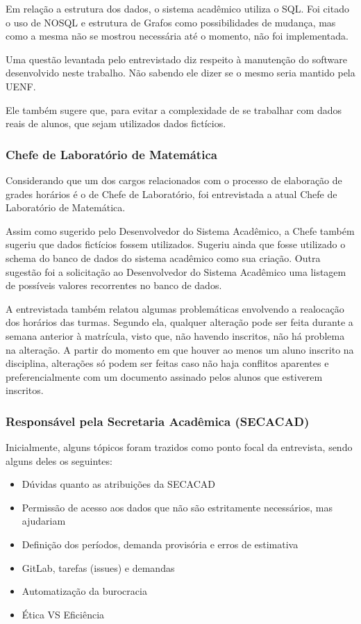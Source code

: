 Em relação a estrutura dos dados, o sistema acadêmico utiliza o SQL. Foi citado o uso de NOSQL e estrutura de Grafos como possibilidades de mudança, mas como a mesma não se mostrou necessária até o momento, não foi implementada.

Uma questão levantada pelo entrevistado diz respeito à manutenção do software desenvolvido neste trabalho. Não sabendo ele dizer se o mesmo seria mantido pela UENF.

Ele também sugere que, para evitar a complexidade de se trabalhar com dados reais de alunos, que sejam utilizados dados fictícios.

\subsubsection{Chefe de Laboratório de Matemática} %

Considerando que um dos cargos relacionados com o processo de elaboração de grades horários é o de Chefe de Laboratório, foi entrevistada a atual Chefe de Laboratório de Matemática.

Assim como sugerido pelo Desenvolvedor do Sistema Acadêmico, a Chefe também sugeriu que dados fictícios fossem utilizados. Sugeriu ainda que fosse utilizado o schema do banco de dados do sistema acadêmico como sua criação. Outra sugestão foi a solicitação ao Desenvolvedor do Sistema Acadêmico uma listagem de possíveis valores recorrentes no banco de dados.

A entrevistada também relatou algumas problemáticas envolvendo a realocação dos horários das turmas. Segundo ela, qualquer alteração pode ser feita durante a semana anterior à matrícula, visto que, não havendo inscritos, não há problema na alteração. A partir do momento em que houver ao menos um aluno inscrito na disciplina, alterações só podem ser feitas caso não haja conflitos aparentes e preferencialmente com um documento assinado pelos alunos que estiverem inscritos.

\subsubsection{Responsável pela Secretaria Acadêmica (SECACAD)} %

Inicialmente, alguns tópicos foram trazidos como ponto focal da entrevista, sendo alguns deles os seguintes:

\begin{itemize}
    \item Dúvidas quanto as atribuições da SECACAD
    \item Permissão de acesso aos dados que não são estritamente necessários, mas ajudariam
    \item Definição dos períodos, demanda provisória e erros de estimativa
    \item GitLab, tarefas (issues) e demandas
    \item Automatização da burocracia
    \item Ética VS Eficiência
\end{itemize}

